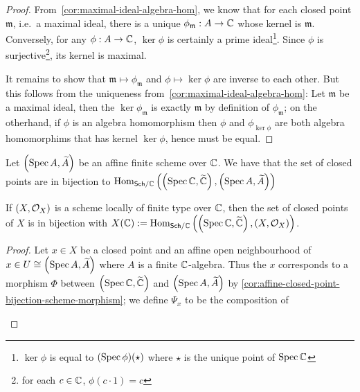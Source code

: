 \begin{proof}
  From~\cref{cor:maximal-ideal-algebra-hom}, we know that for each closed point $\mathfrak m$, i.e.\ a maximal ideal, there is a unique $\phi_{\mathfrak m} : A \to \mathbb{C}$ whose kernel is $\mathfrak m$. Conversely, for any $\phi: A \to \mathbb{C}$, $\ker \phi$ is certainly a prime ideal\footnote{$\ker \phi$ is equal to $(\operatorname{Spec} \phi)(\star)$ where $\star$ is the unique point of $\operatorname{Spec}\mathbb{C}$}. Since $\phi$ is surjective\footnote{for each $c \in \mathbb{C}$, $\phi(c \cdot 1) = c$}, its kernel is maximal.


  It remains to show that $\mathfrak m \mapsto \phi_{\mathfrak{m}}$ and $\phi \mapsto \ker \phi$ are inverse to each other. But this follows from the uniqueness from~\cref{cor:maximal-ideal-algebra-hom}:
  Let $\mathfrak{m}$ be a maximal ideal, then the $\ker \phi_{\mathfrak{m}}$ is exactly $\mathfrak m$ by definition of $\phi_{\mathfrak m}$;
  on the otherhand, if $\phi$ is an algebra homomorphism then $\phi$ and $\phi_{\ker \phi}$ are both algebra homomorphims that has kernel $\ker \phi$, hence must be equal.
\end{proof}

\begin{corollary}\label{cor:affine-closed-point-bijection-scheme-morphism}
  Let $\left(\operatorname*{Spec}{A}, \widetilde{A}\right)$ be an affine finite scheme over $\mathbb{C}$. We have that the set of closed points are in bijection to $\operatorname{Hom}_{\mathsf{Sch}/\mathbb{C}}{\left(\left(\operatorname*{Spec}{\mathbb{C}}, \widetilde{\mathbb{C}}\right), \left(\operatorname*{Spec}{A}, \widetilde{A}\right)\right)}$
\end{corollary}

\begin{proposition}
  If $\left(X, \mathcal{O}_{X}\right)$ is a scheme locally of finite type over $\mathbb{C}$, then the set of closed points of $X$ is in bijection with $X(\mathbb{C}) := \operatorname{Hom}_{\mathsf{Sch}/\mathbb{C}}\left(\left(\operatorname*{Spec}{\mathbb{C}}, \widetilde{\mathbb{C}}\right), \left(X, \mathcal{O}_{X}\right)\right)$.
\end{proposition}


\begin{proof}
  Let $x \in X$ be a closed point and an affine open neighbourhood of $x \in U \cong \left(\operatorname*{Spec}{A}, \widetilde{A}\right)$ where $A$ is a finite $\mathbb{C}$-algebra. Thus the $x$ corresponds to a morphism $\Phi$ between $\left(\operatorname*{Spec}{\mathbb{C}}, \widetilde{\mathbb{C}}\right)$ and $\left(\operatorname*{Spec}{A}, \widetilde{A}\right)$ by \cref{cor:affine-closed-point-bijection-scheme-morphism}; we define $\Psi_{x}$ to be the composition of
  \begin{center}
  \end{center}
\end{proof}
